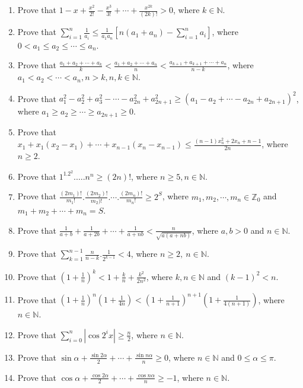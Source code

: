 \begin{enumerate}
\item Prove that $1 - x + \frac{x^2}{2!} - \frac{x^3}{3!} + \cdots + \frac{x^{2k}}{(2k)!} > 0$, where $k\in\mathbb{N}$.
\item Prove that $\displaystyle\sum_{i=1}^n\frac{1}{a_i}\leq\frac{1}{a_1a_n}\left[n(a_1 + a_n) - \sum_{i=1}^na_i\right]$, where
  $0<a_1\leq a_2\leq \cdots\leq a_n$.
\item Prove that $\frac{a_1 + a_2 + \cdots + a_k}{k} < \frac{a_1 + a_2 + \cdots + a_n}{n} < \frac{a_{k + 1} + a_{k + 1} + \cdots +
  a_n}{n - k}$, where $a_1 < a_2 < \cdots < a_n, n > k, n, k\in\mathbb{N}$.
\item Prove that $a_1^2 - a_2^2 + a_3^2 - \cdots - a_{2n}^2 + a_{2n + 1}^2\geq (a_1 - a_2 + \cdots - a_{2n} + a_{2n + 1})^2$, where
  $a_1\geq a_2\geq \cdots \geq a_{2n + 1}\geq 0$.
\item Prove that $x_1 + x_1(x_2 - x_1) + \cdots + x_{n - 1}(x_n - x_{n - 1})\leq \frac{(n - 1)x_n^2 + 2x_n + n - 1}{2n}$, where
  $n\geq 2$.
\item Prove that $1^1.2^2.\ldots .n^n\geq (2n)!$, where $n\geq 5, n\in\mathbb{N}$.
\item Prove that $\frac{(2m_1)!}{m_1!}.\frac{(2m_2)!}{m_2)!}.\cdots .\frac{(2m_n)!}{m_n!}\geq 2^S$, where $m_1, m_2, \cdots,
  m_n\in\mathbb{Z}_0$ and $m_1 + m_2 + \cdots + m_n = S$.
\item Prove that $\frac{1}{a + b} + \frac{1}{a + 2b} + \cdots + \frac{1}{a + nb} < \frac{n}{\sqrt{a(a + nb)}}$, where $a, b > 0$
  and $n\in\mathbb{N}$.
\item Prove that $\displaystyle\sum_{k=1}^{n - 1}\frac{n}{n - k}.\frac{1}{2^{k - 1}} < 4$, where $n\geq 2,~n\in\mathbb{N}$.
\item Prove that $\left(1 + \frac{1}{n}\right)^k < 1 + \frac{k}{n} + \frac{k^2}{2n^2}$, where $k, n\in\mathbb{N}$ and $(k - 1)^2<
  n$.
\item Prove that $\left(1 + \frac{1}{n}\right)^n\left(1 + \frac{1}{4n}\right) < \left(1 + \frac{1}{n + 1}\right)^{n + 1}\left(1 +
  \frac{1}{4(n + 1)}\right)$, where $n\in\mathbb{N}$.
\item Prove that $\displaystyle\sum_{i=0}^n\left|\cos 2^ix\right|\geq \frac{n}{2}$, where $n\in\mathbb{N}$.
\item Prove that $\sin\alpha + \frac{\sin2\alpha}{2} + \cdots + \frac{\sin n\alpha}{n}\geq 0$, where $n\in\mathbb{N}$ and $0 \leq
  \alpha\leq \pi$.
\item Prove that $\cos\alpha + \frac{\cos2\alpha}{2} + \cdots + \frac{\cos n\alpha}{n}\geq -1$, where $n\in\mathbb{N}$.

\end{enumerate}
